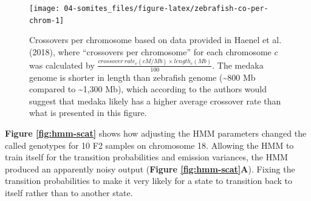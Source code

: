 \documentclass[
]{book}
\begin{document}
\begin{figure}
\texttt{[image: 04-somites\_files/figure-latex/zebrafish-co-per-chrom-1]} \caption{Crossovers per chromosome based on data provided in Haenel et al. (2018), where ``crossovers per chromosome'' for each chromosome \(c\) was calculated by \(\frac{crossover~rate_{c}(cM / Mb) \times length_{c}(Mb)} {100}\). The medaka genome is shorter in length than zebrafish genome (\textasciitilde800 Mb compared to \textasciitilde1,300 Mb), which according to the authors would suggest that medaka likely has a higher average crossover rate than what is presented in this figure.}\label{fig:zebrafish-co-per-chrom}
\end{figure}

\textbf{Figure \ref{fig:hmm-scat}} shows how adjusting the HMM parameters changed the called genotypes for 10 F2 samples on chromosome 18. Allowing the HMM to train itself for the transition probabilities and emission variances, the HMM produced an apparently noisy output (\textbf{Figure \ref{fig:hmm-scat}A}). Fixing the transition probabilities to make it very likely for a state to transition back to itself rather than to another state.
\end{document}
